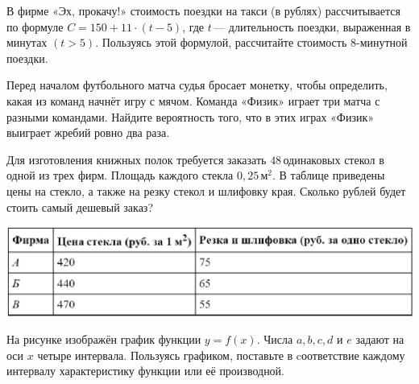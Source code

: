 \begin{homework}[number=3]
\begin{listofex}
\begin{minipage}[t]{0.45\linewidth}
		\end{minipage}
		\item В фирме «Эх, прокачу!» стоимость поездки на такси (в рублях) рассчитывается по формуле \(C=150+11\cdot (t-5)\), где \(t\) --- длительность поездки, выраженная в минутах \((t>5)\). Пользуясь этой формулой, рассчитайте стоимость \(8\)-минутной поездки.
		\item Перед началом футбольного матча судья бросает монетку, чтобы определить, какая из команд начнёт игру с мячом. Команда «Физик» играет три матча с разными командами. Найдите вероятность того, что в этих играх «Физик» выиграет жребий ровно два раза.
		\item 
		\begin{minipage}[t]{\linewidth}
			Для изготовления книжных полок требуется заказать \(48\) одинаковых стекол в одной из трех фирм. Площадь каждого стекла \(0,25\) м\(^2\). В таблице приведены цены на стекло, а также на резку стекол и шлифовку края. Сколько рублей будет стоить самый дешевый заказ?
		\end{minipage}
		\hspace{0.02\linewidth}
		\begin{minipage}[t]{\linewidth}
			\includegraphics[align=t, width=\linewidth]{../pics/G101M8H3-6}
		\end{minipage}
		\item 
		\begin{minipage}[t]{0.65\linewidth}
			На рисунке изображён график функции \(y = f( x)\). Числа \(a, b, c, d\) и \(e\) задают на оси \(x\) четыре интервала. Пользуясь графиком, поставьте в cоответствие каждому интервалу характеристику функции или её производной.
		\end{minipage}
		\hspace{0.02\linewidth}
		\begin{minipage}[t]{\picwidth}

\end{minipage}
\end{listofex}
\end{homework}
